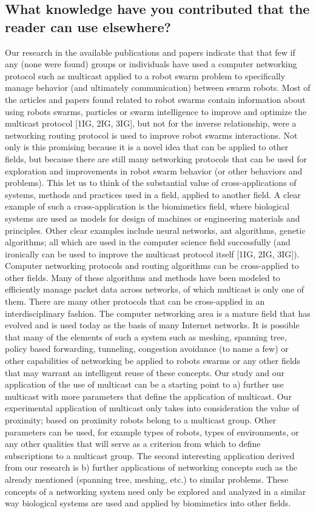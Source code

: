 \documentclass[journal]{IEEEtran}
\begin{document}
\subsection{What knowledge have you contributed that the reader can use elsewhere?}
Our research in the available publications and papers indicate that that few if any (none were found) groups or individuals have used a computer networking protocol such as multicast applied to a robot swarm problem to specifically manage behavior (and ultimately communication) between swarm robots.
Most of the articles and papers found related to robot swarms contain information about using robots swarms, particles or swarm intelligence to improve and optimize the multicast protocol [1IG, 2IG, 3IG], but not for the inverse relationship, were a networking routing protocol is used to improve robot swarms interactions. 
Not only is this promising because it is a novel idea that can be applied to other fields, but because there are still many networking protocols that can be used for exploration and improvements in robot swarm behavior (or other behaviors and problems). 
This let us to think of the substantial value of cross-applications of systems, methods and practices used in a field, applied to another field. A clear example of such a cross-application is the biomimetics field, where biological systems are used as models for design of machines or engineering materials and principles. Other clear examples include neural networks, ant algorithms, genetic algorithms; all which are used in the computer science field successfully (and ironically can be used to improve the multicast protocol itself [1IG, 2IG, 3IG]). 
Computer networking protocols and routing algorithms can be cross-applied to other fields. Many of these algorithms and methods have been modeled to efficiently manage packet data across networks, of which multicast is only one of them.  There are many other protocols that can be cross-applied in an interdisciplinary fashion. The computer networking area is a mature field that has evolved and is used today as the basis of many Internet networks. It is possible that many of the elements of such a system such as meshing, spanning tree, policy based forwarding, tunneling, congestion avoidance (to name a few) or other capabilities of networking be applied to robots swarms or any other fields that may warrant an intelligent reuse of these concepts.  Our study and our application of the use of multicast can be a starting point to a) further use multicast with more parameters that define the application of multicast. Our experimental application of multicast only takes into consideration the value of proximity; based on proximity robots belong to a multicast group. Other parameters can be used, for example types of robots, types of environments, or any other qualities that will serve as a criterion from which to define subscriptions to a multicast group. The second interesting application derived from our research is b) further applications of networking concepts such as the already mentioned (spanning tree, meshing, etc.) to similar problems. These concepts of a networking system need only be explored and analyzed in a similar way biological systems are used and applied by biomimetics into other fields. 
\end{document}

